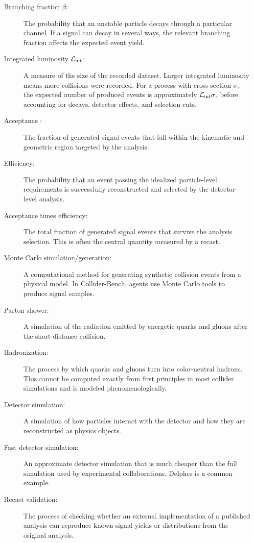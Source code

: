 \documentclass{article}
\begin{document}
\begin{description}
    \item[Branching fraction $\beta$:]
    The probability that an unstable particle decays through a particular channel. If a signal can decay in several ways, the relevant branching fraction affects the expected event yield.

    \item[Integrated luminosity $\mathcal{L}_{\rm int}$:]
    A measure of the size of the recorded dataset. Larger integrated luminosity means more collisions were recorded. For a process with cross section \(\sigma\), the expected number of produced events is approximately \(\mathcal{L}_{\rm int}\sigma\), before accounting for decays, detector effects, and selection cuts.

    \item[Acceptance :]
    The fraction of generated signal events that fall within the kinematic and geometric region targeted by the analysis.

    \item[Efficiency:]
    The probability that an event passing the idealized particle-level requirements is successfully reconstructed and selected by the detector-level analysis.

    \item[Acceptance times efficiency:]
    The total fraction of generated signal events that survive the analysis selection. This is often the central quantity measured by a recast.

    \item[Monte Carlo simulation/generation:]
    A computational method for generating synthetic collision events from a physical model. In Collider-Bench, agents use Monte Carlo tools to produce signal samples.

    \item[Parton shower:]
    A simulation of the radiation emitted by energetic quarks and gluons after the short-distance collision.

    \item[Hadronization:]
    The process by which quarks and gluons turn into color-neutral hadrons. This cannot be computed exactly from first principles in most collider simulations and is modeled phenomenologically.

    \item[Detector simulation:]
    A simulation of how particles interact with the detector and how they are reconstructed as physics objects.

    \item[Fast detector simulation:]
    An approximate detector simulation that is much cheaper than the full simulation used by experimental collaborations. Delphes is a common example.

    \item[Recast validation:]
    The process of checking whether an external implementation of a published analysis can reproduce known signal yields or distributions from the original analysis.
\end{description}
\end{document}
